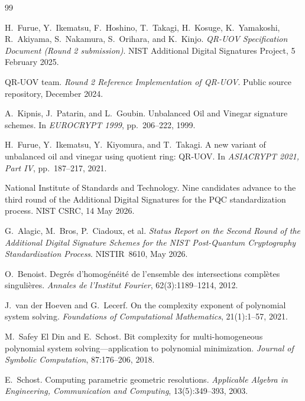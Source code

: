 \documentclass[10pt,a4paper]{article}
\begin{document}
\begin{thebibliography}{99}

H.~Furue, Y.~Ikematsu, F.~Hoshino, T.~Takagi, H.~Kosuge, K.~Yamakoshi, R.~Akiyama, S.~Nakamura, S.~Orihara, and K.~Kinjo.
\newblock \emph{QR-UOV Specification Document (Round 2 submission)}.
\newblock NIST Additional Digital Signatures Project, 5 February 2025.

QR-UOV team.
\newblock \emph{Round 2 Reference Implementation of QR-UOV}.
\newblock Public source repository, December 2024.

A.~Kipnis, J.~Patarin, and L.~Goubin.
\newblock Unbalanced Oil and Vinegar signature schemes.
\newblock In \emph{EUROCRYPT 1999}, pp.~206--222, 1999.

H.~Furue, Y.~Ikematsu, Y.~Kiyomura, and T.~Takagi.
\newblock A new variant of unbalanced oil and vinegar using quotient ring: QR-UOV.
\newblock In \emph{ASIACRYPT 2021, Part IV}, pp.~187--217, 2021.

National Institute of Standards and Technology.
\newblock Nine candidates advance to the third round of the Additional Digital Signatures for the PQC standardization process.
\newblock NIST CSRC, 14 May 2026.

G.~Alagic, M.~Bros, P.~Ciadoux, et al.
\newblock \emph{Status Report on the Second Round of the Additional Digital Signature Schemes for the NIST Post-Quantum Cryptography Standardization Process}.
\newblock NISTIR~8610, May 2026.

O.~Benoist.
\newblock Degr\'es d'homog\'en\'eit\'e de l'ensemble des intersections compl\`etes singuli\`eres.
\newblock \emph{Annales de l'Institut Fourier}, 62(3):1189--1214, 2012.

J.~van der Hoeven and G.~Lecerf.
\newblock On the complexity exponent of polynomial system solving.
\newblock \emph{Foundations of Computational Mathematics}, 21(1):1--57, 2021.

M.~Safey El Din and E.~Schost.
\newblock Bit complexity for multi-homogeneous polynomial system solving---application to polynomial minimization.
\newblock \emph{Journal of Symbolic Computation}, 87:176--206, 2018.

E.~Schost.
\newblock Computing parametric geometric resolutions.
\newblock \emph{Applicable Algebra in Engineering, Communication and Computing}, 13(5):349--393, 2003.


\end{thebibliography}
\end{document}
